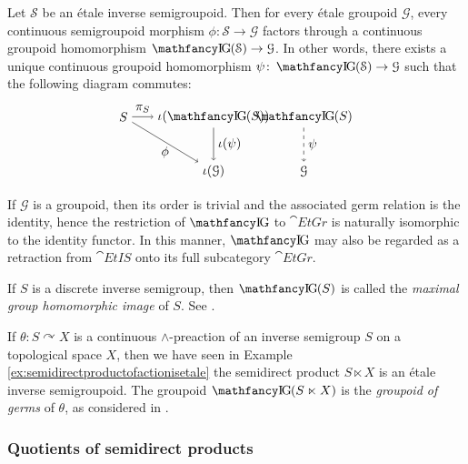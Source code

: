 \begin{proposition}
Let $\mathcal{S}$ be an étale inverse semigroupoid. Then for every étale groupoid $\mathcal{G}$, every continuous semigroupoid morphism $\phi\colon \mathcal{S}\to\mathcal{G}$ factors through a continuous groupoid homomorphism $\IG(\mathcal{S})\to\mathcal{G}$. In other words, there exists a unique continuous groupoid homomorphism $\psi\colon\IG(\mathcal{S})\to\mathcal{G}$ such that the following diagram commutes:
\[\begin{tikzpicture}
\node (S) at (0,0) {$S$};
\node (igS) at ([shift={+(2.5,0)}]S) {$\iota(\IG(S))$};
\node (iG) at ([shift={+(0,-1.5)}]igS) {$\iota(\mathcal{G})$};
\node (gS) at ([shift={+(2.5,0)}]igS) {$\IG(S)$};
\node (G) at ([shift={+(0,-1.5)}]gS) {$\mathcal{G}$};
\draw[->,dashed] (gS)--(G) node[right,midway] {$\psi$};
\draw[->] (igS)--(iG) node[right,midway] {$\iota(\psi)$};
\draw[->] (S)--(igS) node[above,midway] {$\pi_S$};
\draw[->] (S)--(iG) node[below,midway] {$\phi$};
\end{tikzpicture}\]
\end{proposition}

If $\mathcal{G}$ is a groupoid, then its order is trivial and the associated germ relation is the identity, hence the restriction of $\IG$ to $\cat{EtGr}$ is naturally isomorphic to the identity functor. In this manner, $\IG$ may also be regarded as a retraction from $\cat{EtIS}$ onto its full subcategory $\cat{EtGr}$.

\begin{example}
If $S$ is a discrete inverse semigroup, then $\IG(S)$ is called the \emph{maximal group homomorphic image} of $S$. See \cite[Proposition 2.1.2]{MR1724106}.
\end{example}

\begin{example}
If $\theta\colon S\curvearrowright X$ is a continuous $\land$-preaction of an inverse semigroup $S$ on a topological space $X$, then we have seen in Example \ref{ex:semidirectproductofactionisetale} the semidirect product $S\ltimes X$ is an étale inverse semigroupoid. The groupoid $\IG(S\ltimes X)$ is the \emph{groupoid of germs} of $\theta$, as considered in \cite{arxiv1804.00396}.
\end{example}

\subsubsection*{Quotients of semidirect products}

